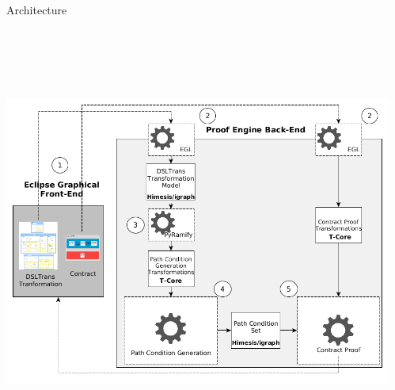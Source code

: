 \documentclass[final,hyperref={pdfpagelabels=false}]{beamer}
\begin{document}
\begin{frame}{}
      \vspace{-1.7cm}
    \begin{columns}[t,totalwidth=\linewidth]
    \centering
      \begin{column}{1\linewidth}
        \begin{block}{Architecture}
         \vspace{-.8cm}
        \small
        \begin{columns}[c,totalwidth=\linewidth]
        \begin{column}{.40\linewidth}
        \begin{center}
        \vspace{-2cm}
        \includegraphics[height=13.4cm]{figures/tooling_arch}\\
        \end{center}
        \end{column}
        \begin{column}{.585\linewidth}
        \begin{center}


\end{center}
\end{column}
\end{columns}
\end{block}
\end{column}
\end{columns}
\end{frame}
\end{document}
